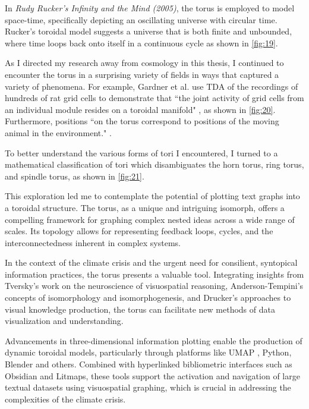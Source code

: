 In \textit{Rudy Rucker's Infinity and the Mind (2005)}, the torus is employed to model space-time, specifically depicting an oscillating universe with circular time. Rucker's toroidal model suggests a universe that is both finite and unbounded, where time loops back onto itself in a continuous cycle as shown in \autoref{fig:19}.

As I directed my research away from cosmology in this thesis, I continued to encounter the torus in a surprising variety of fields in ways that captured a variety of phenomena. For example, Gardner et al. use TDA of the recordings of hundreds of rat grid cells to demonstrate that ``the joint activity of grid cells from an individual module resides on a toroidal manifold" \citep[p. 123]{gardner_toroidal_2022}, as shown in \autoref{fig:20}. Furthermore, positions ``on the torus correspond to positions of the moving animal in the environment." \citep[p. 124]{gardner_toroidal_2022}. 

To better understand the various forms of tori I encountered, I turned to a mathematical classification of tori \citep{weisstein_torus_nodate} which disambiguates the horn torus, ring torus, and spindle torus, as shown in \autoref{fig:21}.

This exploration led me to contemplate the potential of plotting text graphs into a toroidal structure. The torus, as a unique and intriguing isomorph, offers a compelling framework for graphing complex nested ideas across a wide range of scales. Its topology allows for representing feedback loops, cycles, and the interconnectedness inherent in complex systems.

In the context of the climate crisis and the urgent need for consilient, syntopical information practices, the torus presents a valuable tool. Integrating insights from Tversky's work on the neuroscience of visuospatial reasoning, Anderson-Tempini's concepts of isomorphology and isomorphogenesis, and Drucker's approaches to visual knowledge production, the torus can facilitate new methods of data visualization and understanding.

Advancements in three-dimensional information plotting enable the production of dynamic toroidal models, particularly through platforms like UMAP \citep{mcinnes_embedding_2018}, Python, Blender and others. Combined with hyperlinked bibliometric interfaces such as Obsidian and Litmaps, these tools support the activation and navigation of large textual datasets using visuospatial graphing, which is crucial in addressing the complexities of the climate crisis.

